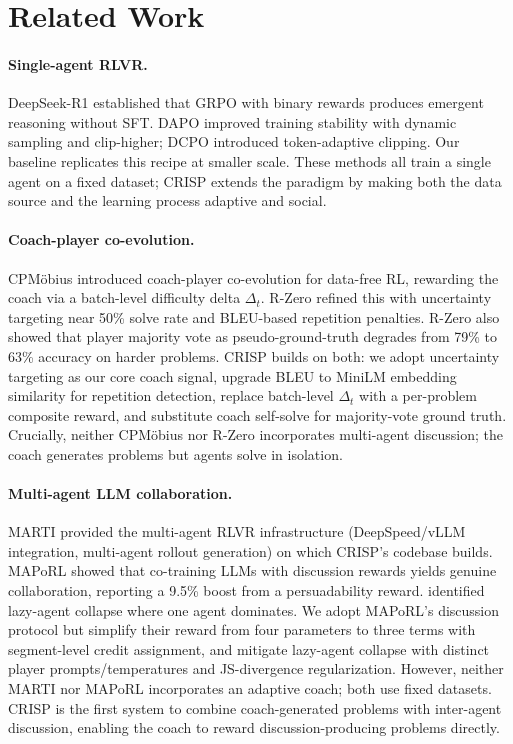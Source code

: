 \documentclass{article}
\begin{document}
\section{Related Work}

\paragraph{Single-agent RLVR.} DeepSeek-R1 \citep{guo2025deepseek} established that GRPO with binary rewards produces emergent reasoning without SFT. DAPO \citep{yu2025dapo} improved training stability with dynamic sampling and clip-higher; DCPO \citep{xu2025dcpo} introduced token-adaptive clipping. Our baseline replicates this recipe at smaller scale. These methods all train a single agent on a fixed dataset; CRISP extends the paradigm by making both the data source and the learning process adaptive and social.

\paragraph{Coach-player co-evolution.} CPM\"{o}bius \citep{li2026cpmobius} introduced coach-player co-evolution for data-free RL, rewarding the coach via a batch-level difficulty delta $\Delta_t$. R-Zero \citep{huang2025rzero} refined this with uncertainty targeting near 50\% solve rate and BLEU-based repetition penalties. R-Zero also showed that player majority vote as pseudo-ground-truth degrades from 79\% to 63\% accuracy on harder problems. CRISP builds on both: we adopt uncertainty targeting as our core coach signal, upgrade BLEU to MiniLM embedding similarity for repetition detection, replace batch-level $\Delta_t$ with a per-problem composite reward, and substitute coach self-solve for majority-vote ground truth. Crucially, neither CPM\"{o}bius nor R-Zero incorporates multi-agent discussion; the coach generates problems but agents solve in isolation.

\paragraph{Multi-agent LLM collaboration.} MARTI \citep{chen2025marti} provided the multi-agent RLVR infrastructure (DeepSpeed/vLLM integration, multi-agent rollout generation) on which CRISP's codebase builds. MAPoRL \citep{park2025maporl} showed that co-training LLMs with discussion rewards yields genuine collaboration, reporting a 9.5\% boost from a persuadability reward. \citet{zhang2025lazy} identified lazy-agent collapse where one agent dominates. We adopt MAPoRL's discussion protocol but simplify their reward from four parameters to three terms with segment-level credit assignment, and mitigate lazy-agent collapse with distinct player prompts/temperatures and JS-divergence regularization. However, neither MARTI nor MAPoRL incorporates an adaptive coach; both use fixed datasets. CRISP is the first system to combine coach-generated problems with inter-agent discussion, enabling the coach to reward discussion-producing problems directly.
\end{document}

